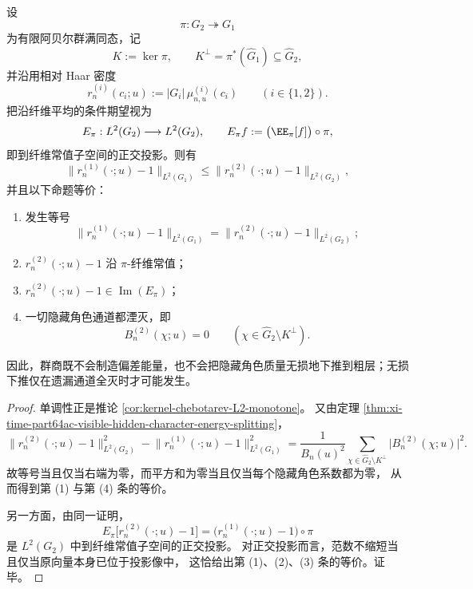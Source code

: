 \begin{theorem}\label{thm:conclusion-quotient-l2-equality-hidden-channels-vanish}
设
\[
\pi:G_2\twoheadrightarrow G_1
\]
为有限阿贝尔群满同态，记
\[
K:=\ker\pi,
\qquad
K^\perp=\pi^\ast(\widehat G_1)\subseteq \widehat G_2,
\]
并沿用相对 Haar 密度
\[
r_n^{(i)}(c_i;u):=|G_i|\,\mu_{n,u}^{(i)}(c_i)
\qquad (i\in\{1,2\}).
\]
把沿纤维平均的条件期望视为
\[
E_\pi:L^2(G_2)\longrightarrow L^2(G_2),
\qquad
E_\pi f:=\bigl(\EE_\pi[f]\bigr)\circ\pi,
\]
即到纤维常值子空间的正交投影。则有
\[
\bigl\|r_n^{(1)}(\cdot;u)-1\bigr\|_{L^2(G_1)}
\le
\bigl\|r_n^{(2)}(\cdot;u)-1\bigr\|_{L^2(G_2)},
\]
并且以下命题等价：
\begin{enumerate}
  \item 发生等号
  \[
  \bigl\|r_n^{(1)}(\cdot;u)-1\bigr\|_{L^2(G_1)}
  =
  \bigl\|r_n^{(2)}(\cdot;u)-1\bigr\|_{L^2(G_2)};
  \]
  \item \(r_n^{(2)}(\cdot;u)-1\) 沿 \(\pi\)-纤维常值；
  \item \(r_n^{(2)}(\cdot;u)-1\in \operatorname{Im}(E_\pi)\)；
  \item 一切隐藏角色通道都湮灭，即
  \[
  B_n^{(2)}(\chi;u)=0
  \qquad
  (\chi\in \widehat G_2\setminus K^\perp).
  \]
\end{enumerate}
因此，群商既不会制造偏差能量，也不会把隐藏角色质量无损地下推到粗层；无损下推仅在遗漏通道全灭时才可能发生。
\end{theorem}
\begin{proof}
单调性正是推论 \ref{cor:kernel-chebotarev-L2-monotone}。
又由定理 \ref{thm:xi-time-part64ac-visible-hidden-character-energy-splitting}，
\[
\bigl\|r_n^{(2)}(\cdot;u)-1\bigr\|_{L^2(G_2)}^2
-
\bigl\|r_n^{(1)}(\cdot;u)-1\bigr\|_{L^2(G_1)}^2
=
\frac{1}{B_n(u)^2}
\sum_{\chi\in \widehat G_2\setminus K^\perp}
\bigl|B_n^{(2)}(\chi;u)\bigr|^2.
\]
故等号当且仅当右端为零，而平方和为零当且仅当每个隐藏角色系数都为零，
从而得到第 (1) 与第 (4) 条的等价。

另一方面，由同一证明，
\[
E_\pi\!\bigl[r_n^{(2)}(\cdot;u)-1\bigr]
=
\bigl(r_n^{(1)}(\cdot;u)-1\bigr)\circ\pi
\]
是 \(L^2(G_2)\) 中到纤维常值子空间的正交投影。
对正交投影而言，范数不缩短当且仅当原向量本身已位于投影像中，
这恰给出第 (1)、(2)、(3) 条的等价。证毕。
\end{proof}

